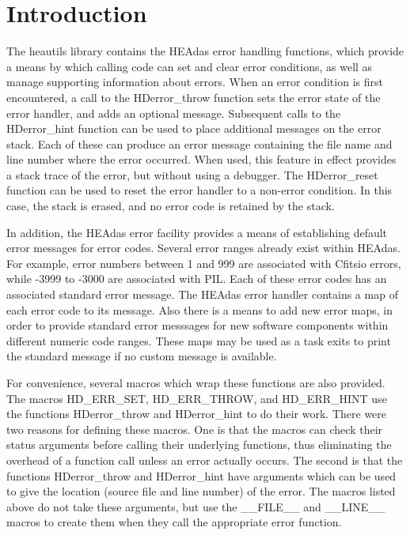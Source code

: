 \documentclass[11pt]{book}
\begin{document}
\section{Introduction}

The heautils library contains the HEAdas error handling
functions, which provide a means by which calling code
can set and clear error conditions, as well as manage
supporting information about errors. When an error condition
is first encountered, a call to the HDerror\_throw function
sets the error state of the error handler, and adds an
optional message. Subsequent calls to the HDerror\_hint
function can be used to place additional messages on the
error stack. Each of these can produce an error message
containing the file name and line number where the error
occurred. When used, this feature in effect provides a
stack trace of the error, but without using a debugger.
The HDerror\_reset function can be used to reset the error
handler to a non-error condition. In this case, the stack
is erased, and no error code is retained by the stack.

In addition, the HEAdas error facility provides a means
of establishing default error messages for error codes.
Several error ranges already exist within HEAdas. For example,
error numbers between 1 and 999 are associated with Cfitsio
errors, while -3999 to -3000 are associated with PIL.
Each of these error codes has an associated standard error
message. The HEAdas error handler contains a map of each
error code to its message. Also there is a means to add new
error maps, in order to provide standard error messsages
for new software components within different numeric code
ranges. These maps may be used as a task exits to print the
standard message if no custom message is available.

For convenience, several macros which wrap these functions
are also provided. The
macros HD\_ERR\_SET, HD\_ERR\_THROW, and HD\_ERR\_HINT use the
functions HDerror\_throw and HDerror\_hint to do their work.
There were two reasons for defining these macros. One is that
the macros can check their status arguments before calling
their underlying functions, thus eliminating the overhead of
a function call unless an error actually occurs. The second
is that the functions HDerror\_throw and HDerror\_hint have
arguments which can be used to give the location
(source file and line number) of the error. The macros listed
above do not take these arguments, but use the \_\_FILE\_\_
and \_\_LINE\_\_ macros to create them when they call the
appropriate error function.
\end{document}
